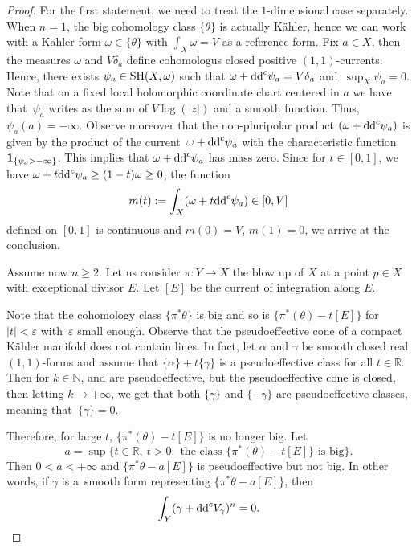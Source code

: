 \documentclass[pdftex]{sigma}
\numberwithin{equation}{section}
\theoremstyle{plain}
\newcommand{\N}{\mathbb N}
\newcommand \SH {{\rm SH}}
\begin{document}
\begin{proof} For the first statement, we need to treat the $1$-dimensional case separately. When $n=1$, the big cohomology class $\{\theta\}$ is actually K\"ahler, hence we can work with a K\"ahler form $\omega\in \{\theta\}$ with $\int_X \omega = V$ as a reference form.
Fix $a\in X$, then the measures $\omega$ and $V \delta_a$ define cohomologus closed positive $(1,1)$-currents. Hence, there exists $\psi_a \in \SH(X,\omega)$ such that $\omega + {\rm dd}^c \psi_a = V \delta_a$ and~$\sup_X \psi_a = 0$.
Note that on a fixed local holomorphic coordinate chart centered in $a$ we have that~$\psi_a $ writes as the sum of $ V \log(|z|)$ and a smooth function. Thus, $ \psi_a(a) = - \infty$. Observe moreover that the non-pluripolar product $( \omega + {\rm dd}^c \psi_a)$ is given by the product of the current~${\omega + {\rm dd}^c \psi_a}$ with the characteristic function $ {\bf 1}_{ \{ \psi_a > - \infty \} }$. This implies that $\omega + {\rm dd}^c \psi_a$ has mass zero. Since for $t \in [0,1]$, we have $ \omega +t {\rm dd}^c \psi_a \geq (1-t) \omega \geq 0$, the function
\[m(t):= \int_X (\omega+t{\rm dd}^c\psi_a)\in [0, V]\]
 defined on $[0,1]$ is continuous and $m(0)=V$, $m(1)=0$, we arrive at the conclusion.

Assume now $n\geq 2$. Let us consider $\pi \colon Y \to X$ the blow up of $X$ at a point $p \in X$ with exceptional divisor $E$. Let $[E]$ be the current of integration along $E$.

Note that the cohomology class $\{ \pi^*\theta \} $ is big and so is $\{\pi^*(\theta) - t [E]\}$ for $ |t| < \varepsilon$ with~$\varepsilon$ small enough.
Observe that the pseudoeffective cone of a compact K\"ahler manifold does not contain lines. In fact, let $\alpha $ and $\gamma$ be smooth closed real $(1,1)$-forms and assume that
${\{ \alpha \} + t \{ \gamma \}}$ is a pseudoeffective class for all
$t \in \mathbb{R}$.
Then for $k \in { \N}$,  and  are pseudoeffective, but the pseudoeffective cone is closed, then letting $k\rightarrow +\infty$, we get that both
$\{ \gamma \}$ and $\{ - \gamma \} $ are pseudoeffective classes, meaning that~${\{ \gamma \} = 0}$.

Therefore, for large $t$, $\{\pi^*(\theta) - t [E] \}$ is no longer big. Let
\[a = \sup \{ t \in \mathbb{R}, \ t > 0 \colon \mbox{ the class $\{ \pi^*(\theta) - t[E] \}$ is big} \}.
\]
Then $ 0< a < +\infty $ and
$\{\pi^*\theta - a [E]\}$ is pseudoeffective but not big.
In other words, if $\gamma$ is a~smooth form representing
$\{ \pi^*\theta - a [E] \}$, then
\[\int_Y (\gamma+{\rm dd}^c V_\gamma)^n = 0. \]


\end{proof}
\end{document}
